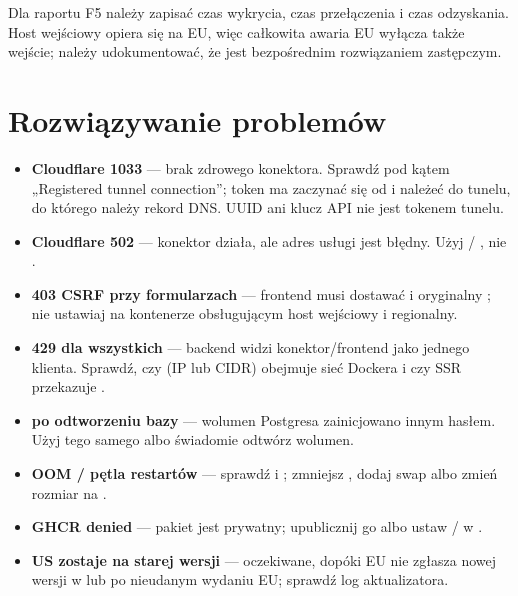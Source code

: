 Dla raportu F5 należy zapisać czas wykrycia, czas przełączenia i czas
odzyskania. Host wejściowy opiera się na EU, więc całkowita awaria EU wyłącza
także wejście; należy udokumentować, że  jest
bezpośrednim rozwiązaniem zastępczym.

\section{Rozwiązywanie problemów}
\label{sec:op-problemy}

\begin{itemize}
  \item \textbf{Cloudflare 1033} --- brak zdrowego konektora. Sprawdź  pod kątem „Registered tunnel connection''; token ma zaczynać się od  i należeć do tunelu, do którego należy rekord DNS. UUID ani klucz API nie jest tokenem tunelu.
  \item \textbf{Cloudflare 502} --- konektor działa, ale adres usługi jest błędny. Użyj  / , nie .
  \item \textbf{403 CSRF przy formularzach} --- frontend musi dostawać  i oryginalny ; nie ustawiaj  na kontenerze obsługującym host wejściowy i regionalny.
  \item \textbf{429 dla wszystkich} --- backend widzi konektor/frontend jako jednego klienta. Sprawdź, czy  (IP lub CIDR) obejmuje sieć Dockera i czy SSR przekazuje .
  \item \textbf{ po odtworzeniu bazy} --- wolumen Postgresa zainicjowano innym hasłem. Użyj tego samego  albo świadomie odtwórz wolumen.
  \item \textbf{OOM / pętla restartów} --- sprawdź  i ; zmniejsz , dodaj swap albo zmień rozmiar na .
  \item \textbf{GHCR denied} --- pakiet jest prywatny; upublicznij go albo ustaw  /  w .
  \item \textbf{US zostaje na starej wersji} --- oczekiwane, dopóki EU nie zgłasza nowej wersji w  lub po nieudanym wydaniu EU; sprawdź log aktualizatora.
\end{itemize}

